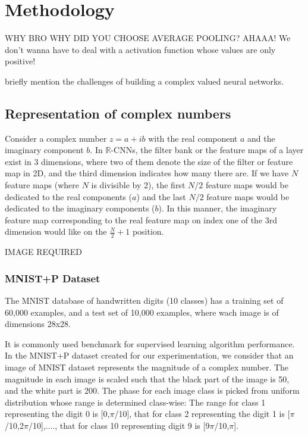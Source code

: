 \chapter{Methodology} \label{chap:methodology}
 
 WHY BRO WHY DID YOU CHOOSE AVERAGE POOLING?
 AHAAA!  We don't wanna have to deal with a activation function whose values are only positive!
 
 briefly mention the challenges of building a complex valued neural networks. 
 
 \section{Representation of complex numbers}
 Consider a complex number $z=a+ib$ with the real component $a$ and the imaginary component $b$. In $\mathbb{R}$-CNNs, the filter bank or the feature maps of a layer exist in 3 dimensions, where two of them denote the size of the filter or feature map in 2D, and the third dimension indicates how many there are. If we have $N$ feature maps (where $N$ is divisible by 2), the first $N/2$ feature maps would be dedicated to the real components ($a$) and the last $N/2$ feature maps would be dedicated to the imaginary components ($b$). In this manner, the imaginary feature map corresponding to the real feature map on index one of the 3rd dimension would like on the $\frac{N}{2} +1$ position.
 
 IMAGE REQUIRED
 
 \subsection{MNIST+P Dataset}
 The MNIST database of handwritten digits (10 classes) has a training set of 60,000 examples, and a test set of 10,000 examples, where wach image is of dimensions 28x28. 
 
 
 It is commonly used benchmark for supervised learning algorithm performance. In the MNIST+P dataset created for our experimentation, we consider that an image of MNIST dataset represents the magnitude of a complex number. The magnitude in each image is scaled such that the black part of the image is 50, and the white part is 200. The phase for each image class is picked from uniform distribution whose range is determined class-wise: The range for class 1 representing the digit 0 is [0,$\pi$/10], that for class 2 representing the digit 1 is [$\pi$/10,2$\pi$/10],...., that for class 10 representing digit 9 is [9$\pi$/10,$\pi$]. 
 
